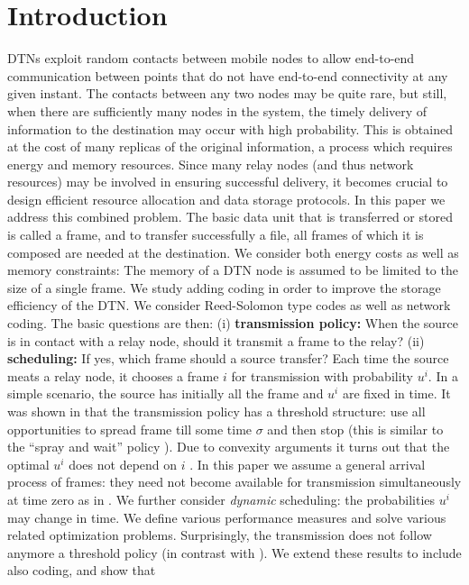 \documentclass[10pt,twocolumn,conference,final]{IEEEtran}
\begin{document}
\section{Introduction}\label{sec:intro}
DTNs exploit random contacts between mobile nodes
to allow end-to-end communication between points that do not have
end-to-end connectivity at any given instant. The contacts between any
two nodes may be quite rare, but still, when there are sufficiently
many nodes in the system, the timely delivery of information to the destination
may occur with high probability. This is obtained at the cost of
many replicas of the original information, a process which requires
energy and memory resources.
Since many relay nodes (and thus network resources) may be involved in ensuring
successful delivery, it becomes crucial to design efficient resource allocation
and data storage protocols. In this paper we address this combined
problem. The basic data unit that is transferred or stored is called a frame,
and to transfer successfully a file, all frames of which it is composed are
needed at the destination.
We consider both energy costs as well as memory constraints: The memory
of a DTN node is assumed to be limited to the size  of a single frame.
We study adding coding in order to improve
the storage efficiency of the DTN. We consider
Reed-Solomon type codes as well as network coding.
The basic questions are then: (i) {\bf transmission policy:}
When the source is in contact with a relay node, should it transmit a frame to the relay?
(ii) {\bf scheduling:} If yes, which frame should a source transfer?
Each time the source meats a relay node, it chooses a frame $i$ for transmission with probability $u^i$.
In a simple scenario, the source has initially all the frame and $u^i$ are fixed  in time.
It was shown in \cite{infocom09} that the transmission policy has a threshold structure: use all opportunities
to spread frame till some time $\sigma$ and then stop  (this is similar to the ``spray and wait'' policy \cite{SPR}).
Due to convexity arguments it turns out that the optimal $u^i$ does not depend on $i$ \cite{infocom09}.
In this paper we assume a general arrival process of frames: they need
not become available for transmission simultaneously at time zero as in 
\cite{infocom09}. We further consider {\it dynamic} scheduling: the probabilities
$u^i$ may change in time. We define various performance measures and
solve various related optimization problems.
Surprisingly, the transmission does not follow anymore a
threshold policy (in contrast with \cite{infocom09}). We extend these results to include also coding, and show that
\end{document}
